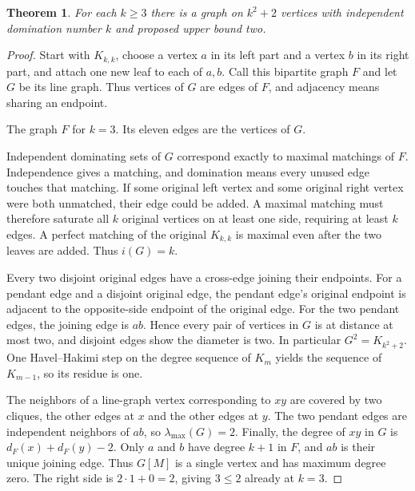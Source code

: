 \documentclass[10pt,letterpaper]{amsart}
\newtheorem*{theorem}{Theorem}
\begin{document}
\begin{theorem}For each $k\ge3$ there is a graph on $k^2+2$ vertices with
independent domination number $k$ and proposed upper bound two.\end{theorem}
\begin{proof}
Start with $K_{k,k}$, choose a vertex $a$ in its left part and a vertex $b$
in its right part, and attach one new leaf to each of $a,b$. Call this
bipartite graph $F$ and let $G$ be its line graph. Thus vertices of $G$
are edges of $F$, and adjacency means sharing an endpoint.

\begin{center}
\par
{\footnotesize The graph $F$ for $k=3$. Its eleven edges are the vertices of $G$.}
\end{center}

Independent dominating sets of $G$ correspond exactly to maximal matchings
of $F$. Independence gives a matching, and domination means every unused
edge touches that matching. If some original left vertex and some original
right vertex were both unmatched, their edge could be added. A maximal
matching must therefore saturate all $k$ original vertices on at least one
side, requiring at least $k$ edges. A perfect matching of the original
$K_{k,k}$ is maximal even after the two leaves are added. Thus $i(G)=k$.

Every two disjoint original edges have a cross-edge joining their endpoints.
For a pendant edge and a disjoint original edge, the pendant edge's original
endpoint is adjacent to the opposite-side endpoint of the original edge.
For the two pendant edges, the joining edge is $ab$. Hence every pair of
vertices in $G$ is at distance at most two, and disjoint edges show the
diameter is two. In particular $G^2=K_{k^2+2}$. One Havel--Hakimi step on
the degree sequence of $K_m$ yields the sequence of $K_{m-1}$, so its
residue is one.

The neighbors of a line-graph vertex corresponding to $xy$ are covered by
two cliques, the other edges at $x$ and the other edges at $y$. The two
pendant edges are independent neighbors of $ab$, so $\lambda_{\max}(G)=2$.
Finally, the degree of $xy$ in $G$ is $d_F(x)+d_F(y)-2$. Only $a$ and $b$
have degree $k+1$ in $F$, and $ab$ is their unique joining edge.
Thus $G[M]$ is a single vertex and has maximum degree zero.
The right side is $2\cdot1+0=2$, giving $3\le2$ already at $k=3$.
\end{proof}
\end{document}

